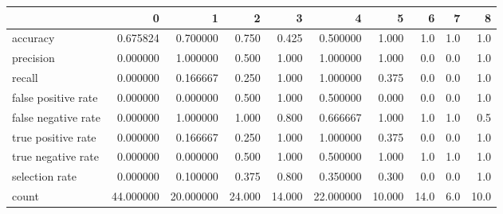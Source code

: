 \begin{tabular}{lrrrrrrrrr}
\toprule
{} &          0 &          1 &       2 &       3 &          4 &       5 &     6 &    7 &     8 \\
\midrule
accuracy            &   0.675824 &   0.700000 &   0.750 &   0.425 &   0.500000 &   1.000 &   1.0 &  1.0 &   1.0 \\
precision           &   0.000000 &   1.000000 &   0.500 &   1.000 &   1.000000 &   1.000 &   0.0 &  0.0 &   1.0 \\
recall              &   0.000000 &   0.166667 &   0.250 &   1.000 &   1.000000 &   0.375 &   0.0 &  0.0 &   1.0 \\
false positive rate &   0.000000 &   0.000000 &   0.500 &   1.000 &   0.500000 &   0.000 &   0.0 &  0.0 &   1.0 \\
false negative rate &   0.000000 &   1.000000 &   1.000 &   0.800 &   0.666667 &   1.000 &   1.0 &  1.0 &   0.5 \\
true positive rate  &   0.000000 &   0.166667 &   0.250 &   1.000 &   1.000000 &   0.375 &   0.0 &  0.0 &   1.0 \\
true negative rate  &   0.000000 &   0.000000 &   0.500 &   1.000 &   0.500000 &   1.000 &   1.0 &  1.0 &   1.0 \\
selection rate      &   0.000000 &   0.100000 &   0.375 &   0.800 &   0.350000 &   0.300 &   0.0 &  0.0 &   1.0 \\
count               &  44.000000 &  20.000000 &  24.000 &  14.000 &  22.000000 &  10.000 &  14.0 &  6.0 &  10.0 \\
\bottomrule
\end{tabular}
